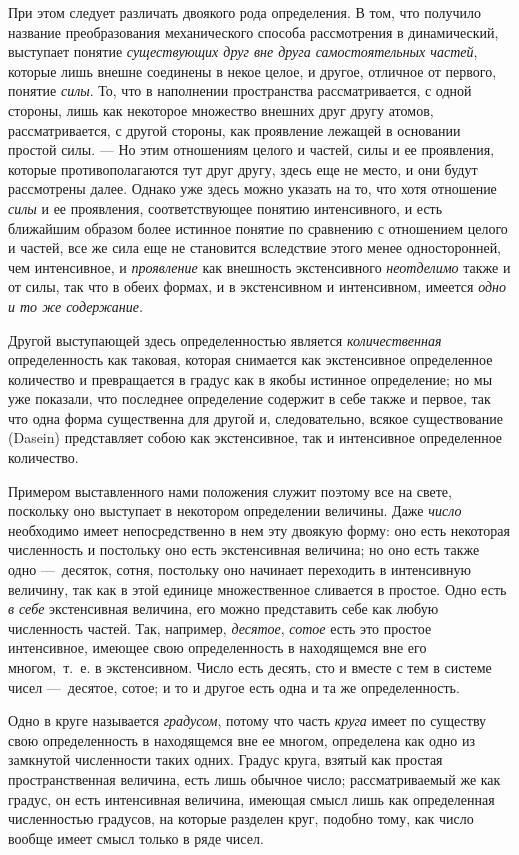 При этом следует различать двоякого рода определения. В том, что получило
название преобразования механического способа рассмотрения в динамический,
выступает понятие {\em существующих друг вне друга
самостоятельных частей}, которые лишь внешне соединены в некое целое, и
другое, отличное от первого, понятие {\em силы}. То,
что в наполнении пространства рассматривается, с одной стороны, лишь как
некоторое множество внешних друг другу атомов, рассматривается, с другой
стороны, как проявление лежащей в основании простой силы. — Но этим
отношениям целого и частей, силы и ее проявления, которые противополагаются
тут друг другу, здесь еще не место, и они будут рассмотрены далее. Однако
уже здесь можно указать на то, что хотя отношение
{\em силы} и ее проявления, соответствующее понятию
интенсивного, и есть ближайшим образом более истинное понятие по сравнению
с отношением целого и частей, все же сила еще не становится вследствие
этого менее односторонней, чем интенсивное, и
{\em проявление} как внешность экстенсивного
{\em неотделимо} также и от силы, так что в обеих
формах, и в экстенсивном и интенсивном, имеется
{\em одно и то же содержание}.

Другой выступающей здесь определенностью является
{\em количественная} определенность как таковая,
которая снимается как экстенсивное определенное количество и превращается в
градус как в якобы истинное определение; но мы уже показали, что последнее
определение содержит в себе также и первое, так что одна форма существенна
для другой и, следовательно, всякое существование (Dasein) представляет
собою как экстенсивное, так и интенсивное определенное количество.

Примером выставленного нами положения служит поэтому все на свете, поскольку
оно выступает в некотором определении величины. Даже
{\em число} необходимо имеет непосредственно в нем эту
двоякую форму: оно есть некоторая численность и постольку оно есть
экстенсивная величина; но оно есть также одно —~десяток, сотня, постольку
оно начинает переходить в интенсивную величину, так как в этой единице
множественное сливается в простое. Одно есть {\em в
себе} экстенсивная величина, его можно представить себе как любую
численность частей. Так, например, {\em десятое},
{\em сотое} есть это простое интенсивное, имеющее свою
определенность в находящемся вне его многом,~т.~е. в экстенсивном. Число
есть десять, сто и вместе с тем в системе чисел —~десятое, сотое; и то и
другое есть одна и та же определенность.

Одно в круге называется {\em градусом}, потому что часть
{\em круга} имеет по существу свою определенность в
находящемся вне ее многом, определена как одно из замкнутой численности
таких одних. Градус круга, взятый как простая пространственная величина,
есть лишь обычное число; рассматриваемый же как градус, он есть интенсивная
величина, имеющая смысл лишь как определенная численностью градусов, на
которые разделен круг, подобно тому, как число вообще имеет смысл только в
ряде чисел.

